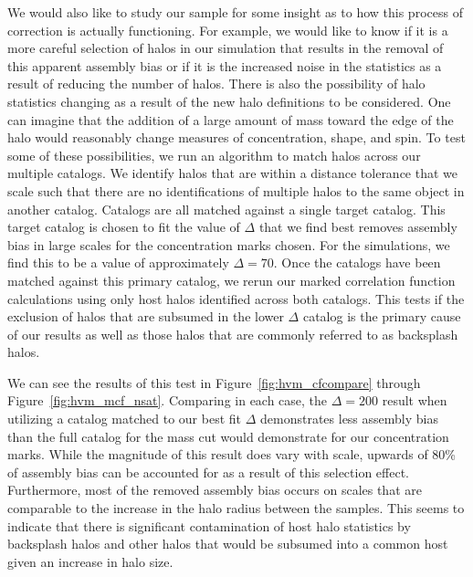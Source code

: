 \documentclass[usenatbib,usegraphicx,letterpaper]{mn2e}
\begin{document}
We would also like to study our sample for some insight as to how this process of correction is actually functioning. For example, we would like to know if it is a more careful selection of halos in our simulation that results in the removal of this apparent assembly bias or if it is the increased noise in the statistics as a result of reducing the number of halos. There is also the possibility of halo statistics changing as a result of the new halo definitions to be considered. One can imagine that the addition of a large amount of mass toward the edge of the halo would reasonably change measures of concentration, shape, and spin. To test some of these possibilities, we run an algorithm to match halos across our multiple catalogs. We identify halos that are within a distance tolerance that we scale such that there are no identifications of multiple halos to the same object in another catalog. Catalogs are all matched against a single target catalog. This target catalog is chosen to fit the value of $\Delta$ that we find best removes assembly bias in large scales for the concentration marks chosen. For the \citet{diemer15} simulations, we find this to be a value of approximately $\Delta = 70$. Once the catalogs have been matched against this primary catalog, we rerun our marked correlation function calculations using only host halos identified across both catalogs. This tests if the exclusion of halos that are subsumed in the lower $\Delta$ catalog is the primary cause of our results as well as those halos that are commonly referred to as backsplash halos.

We can see the results of this test in Figure~\ref{fig:hvm_cfcompare} through Figure~\ref{fig:hvm_mcf_nsat}. Comparing in each case, the $\Delta = 200$ result when utilizing a catalog matched to our best fit $\Delta$ demonstrates less assembly bias than the full catalog for the mass cut would demonstrate for our concentration marks. While the magnitude of this result does vary with scale, upwards of 80\% of assembly bias can be accounted for as a result of this selection effect. Furthermore, most of the removed assembly bias occurs on scales that are comparable to the increase in the halo radius between the samples. This seems to indicate that there is significant contamination of host halo statistics by backsplash halos and other halos that would be subsumed into a common host given an increase in halo size.
\end{document}
